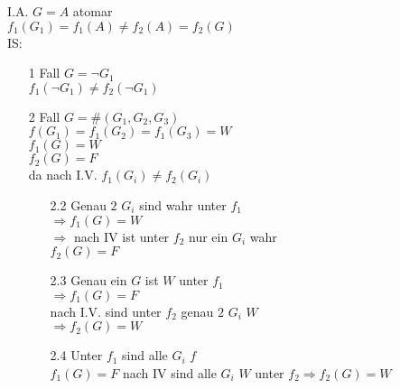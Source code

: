 \documentclass[a4paper]{scrartcl}
\begin{document}
I.A. $G = A$ atomar\\
$f_1(G_1) = f_1(A) \neq f_2(A) = f_2(G)$\\
IS:
\begin{enumerate}
\item[1 Fall] $G = \neg G_1$\\
$f_1( \neg G_1) \neq f_2( \neg G_1)$

\item[2 Fall] $G = \# (G_1, G_2, G_3)$\\
$f(G_1) = f_1(G_2) = f_1 (G_3) = W$\\
$f_1 (G) = W$\\
$f_2(G) = F$\\
da nach I.V. $f_1(G_i) \neq f_2 (G_i)$

\begin{enumerate}
\item[2.2] Genau $2$ $G_i$ sind wahr unter $f_1$\\
$\Rightarrow f_1(G) = W$\\
$\Rightarrow$ nach IV ist unter $f_2$ nur ein $G_i$ wahr\\
$f_2(G) = F$

\item[2.3] Genau ein $G$ ist $W$ unter $f_1$\\
$\Rightarrow f_1 (G) = F$\\
nach I.V. sind unter $f_2$ genau $2$ $G_i$ $W$\\
$\Rightarrow f_2 (G) = W$\\

\item[2.4] Unter $f_1$ sind alle $G_i$ $f$\\
$f_1(G) = F$ nach IV sind alle $G_i$ $W$ unter $f_2 \Rightarrow f_2 ( G) = W$
\end{enumerate}
\end{enumerate}
\end{document}
